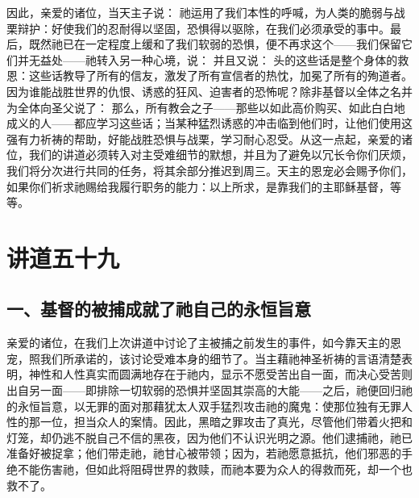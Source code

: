 因此，亲爱的诸位，当天主子说： 祂运用了我们本性的呼喊，为人类的脆弱与战栗辩护：好使我们的忍耐得以坚固，恐惧得以驱除，在我们必须承受的事中。最后，既然祂已在一定程度上缓和了我们软弱的恐惧，便不再求这个——我们保留它们并无益处——祂转入另一种心境，说： 并且又说： 头的这些话是整个身体的救恩：这些话教导了所有的信友，激发了所有宣信者的热忱，加冕了所有的殉道者。因为谁能战胜世界的仇恨、诱惑的狂风、迫害者的恐怖呢？除非基督以全体之名并为全体向圣父说了： 那么，所有教会之子——那些以如此高价购买、如此白白地成义的人——都应学习这些话；当某种猛烈诱惑的冲击临到他们时，让他们使用这强有力祈祷的帮助，好能战胜恐惧与战栗，学习耐心忍受。从这一点起，亲爱的诸位，我们的讲道必须转入对主受难细节的默想，并且为了避免以冗长令你们厌烦，我们将分次进行共同的任务，将其余部分推迟到周三。天主的恩宠必会赐予你们，如果你们祈求祂赐给我履行职务的能力：以上所求，是靠我们的主耶稣基督，等等。\par



\section{讲道五十九}

\par


\subsection{一、基督的被捕成就了祂自己的永恒旨意}

亲爱的诸位，在我们上次讲道中讨论了主被捕之前发生的事件，如今靠天主的恩宠，照我们所承诺的，该讨论受难本身的细节了。当主藉祂神圣祈祷的言语清楚表明，神性和人性真实而圆满地存在于祂内，显示不愿受苦出自一面，而决心受苦则出自另一面——即排除一切软弱的恐惧并坚固其崇高的大能——之后，祂便回归祂的永恒旨意，以无罪的面对那藉犹太人双手猛烈攻击祂的魔鬼：使那位独有无罪人性的那一位，担当众人的案情。因此，黑暗之罪攻击了真光，尽管他们带着火把和灯笼，却仍逃不脱自己不信的黑夜，因为他们不认识光明之源。他们逮捕祂，祂已准备好被捉拿；他们带走祂，祂甘心被带领；因为，若祂愿意抵抗，他们邪恶的手绝不能伤害祂，但如此将阻碍世界的救赎，而祂本要为众人的得救而死，却一个也救不了。\par

